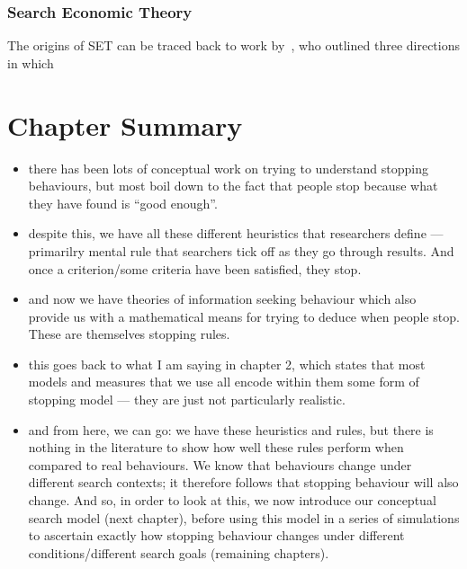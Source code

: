 \subsubsection{Search Economic Theory}\label{sec:stopping:theories:set}
The origins of SET can be traced back to work by~\cite{varian1999economics}, who outlined three directions in which 

\section{Chapter Summary}

\begin{itemize}
\item there has been lots of conceptual work on trying to understand stopping behaviours, but most boil down to the fact that people stop because what they have found is “good enough”.
\item despite this, we have all these different heuristics that researchers define — primarilry mental rule that searchers tick off as they go through results. And once a criterion/some criteria have been satisfied, they stop.
\item and now we have theories of information seeking behaviour which also provide us with a mathematical means for trying to deduce when people stop. These are themselves stopping rules.
\item this goes back to what I am saying in chapter 2, which states that most models and measures that we use all encode within them some form of stopping model — they are just not particularly realistic.
\item and from here, we can go: we have these heuristics and rules, but there is nothing in the literature to show how well these rules perform when compared to real behaviours. We know that behaviours change under different search contexts; it therefore follows that stopping behaviour will also change. And so, in order to look at this, we now introduce our conceptual search model (next chapter), before using this model in a series of simulations to ascertain exactly how stopping behaviour changes under different conditions/different search goals (remaining chapters).
\end{itemize}
